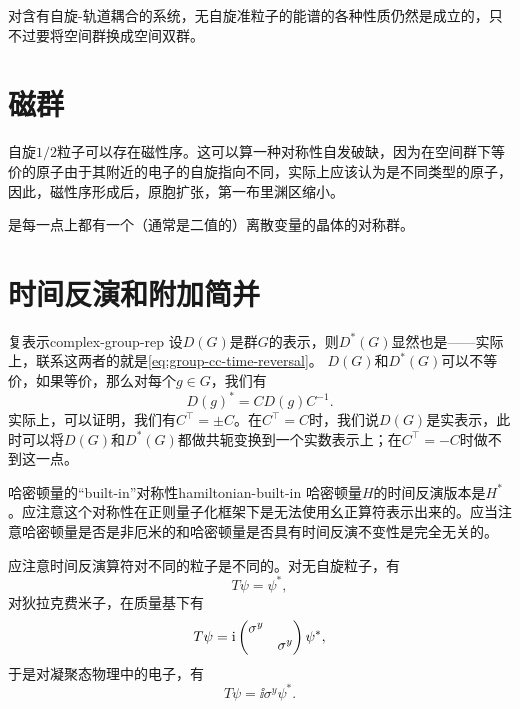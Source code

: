 对含有自旋-轨道耦合的系统，无自旋准粒子的能谱的各种性质仍然是成立的，只不过要将空间群换成空间双群。

\section{磁群}

自旋$1/2$粒子可以存在磁性序。这可以算一种对称性自发破缺，因为在空间群下等价的原子由于其附近的电子的自旋指向不同，实际上应该认为是不同类型的原子，因此，磁性序形成后，原胞扩张，第一布里渊区缩小。

是每一点上都有一个（通常是二值的）离散变量的晶体的对称群。

\section{时间反演和附加简并} %

\begin{back}{复表示}{complex-group-rep}
    设$D(G)$是群$G$的表示，则$D^*(G)$显然也是——实际上，联系这两者的就是\eqref{eq:group-cc-time-reversal}。
    $D(G)$和$D^*(G)$可以不等价，如果等价，那么对每个$g \in G$，我们有
    \[
        D(g)^* = C D(g) C^{-1}.
    \]
    实际上，可以证明，我们有$C^\top = \pm C$。在$C^\top = C$时，我们说$D(G)$是实表示，此时可以将$D(G)$和$D^*(G)$都做共轭变换到一个实数表示上；在$C^\top = - C$时做不到这一点。
\end{back}

\begin{back}{哈密顿量的“built-in”对称性}{hamiltonian-built-in}
    哈密顿量$H$的时间反演版本是$H^*$。应注意这个对称性在正则量子化框架下是无法使用幺正算符表示出来的。应当注意哈密顿量是否是非厄米的和哈密顿量是否具有时间反演不变性是完全无关的。 
    
    应注意时间反演算符对不同的粒子是不同的。对无自旋粒子，有
    \begin{equation}
        T \psi = \psi^*,
    \end{equation}
    对狄拉克费米子，在质量基下有
    \begin{equation}
        T \psi = \ii \pmqty{\dmat{\sigma^y, \sigma^y}} \psi^*,
    \end{equation}
    于是对凝聚态物理中的电子，有
    \begin{equation}
        T \psi = \ii \sigma^y \psi^*.
    \end{equation}
\end{back}

